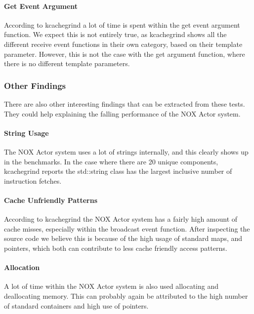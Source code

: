 \paragraph{Get Event Argument}
According to kcachegrind a lot of time is spent within the get event argument function.
We expect this is not entirely true, as kcachegrind shows all the different receive event functions in their own category,
based on their template parameter.
However, this is not the case with the get argument function, where there is no different template parameters.

\subsubsection{Other Findings}
There are also other interesting findings that can be extracted from these tests.
They could help explaining the falling performance of the NOX Actor system.

\paragraph{String Usage}
The NOX Actor system uses a lot of strings internally, and this clearly shows up in the benchmarks.
In the case where there are 20 unique components, kcachegrind reports the std::string class has the largest
inclusive number of instruction fetches.

\paragraph{Cache Unfriendly Patterns}
According to kcachegrind the NOX Actor system has a fairly high amount of cache misses,
especially within the broadcast event function.
After inspecting the source code we believe this is because of the high usage of standard maps, and pointers, which
both can contribute to less cache friendly access patterns.

\paragraph{Allocation}
A lot of time within the NOX Actor system is also used allocating and deallocating memory.
This can probably again be attributed to the high number of standard containers and high use of pointers.

